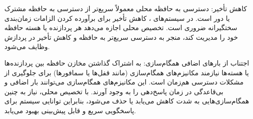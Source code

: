 کاهش تأخیر: دسترسی به حافظه محلی معمولاً سریع‌تر از دسترسی به حافظه مشترک یا دور است. در سیستم‌های ، کاهش تأخیر برای برآورده کردن الزامات زمان‌بندی سختگیرانه ضروری است. تخصیص محلی اجازه می‌دهد هر پردازنده یا هسته حافظه خود را مدیریت کند، منجر به دسترسی سریع‌تر به حافظه و کاهش تأخیر در پردازش وظایف  می‌شود.

اجتناب از بارهای اضافی همگام‌سازی: به اشتراک گذاشتن مخازن حافظه بین پردازنده‌ها یا هسته‌ها نیازمند مکانیزم‌های همگام‌سازی (مانند قفل‌ها یا سمافورها) برای جلوگیری از مشکلات دسترسی هم‌زمان است. این مکانیزم‌های همگام‌سازی می‌توانند بار اضافی و بی‌قاعدگی در زمان پاسخ‌دهی را به وجود آورند. با تخصیص محلی، نیاز به چنین همگام‌سازی‌هایی به شدت کاهش می‌یابد یا حذف می‌شود، بنابراین توانایی سیستم برای پاسخگویی سریع و قابل پیش‌بینی بهبود می‌یابد.
